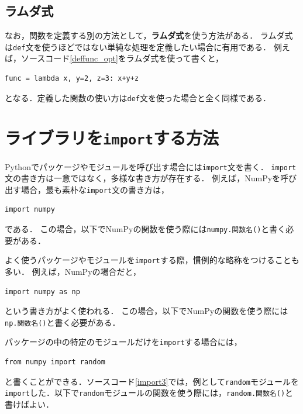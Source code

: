 \documentclass[a4paper,12pt]{jsarticle}
\begin{document}
\subsection{ラムダ式}

なお，関数を定義する別の方法として，{\bf ラムダ式}を使う方法がある．
ラムダ式は\texttt{def}文を使うほどではない単純な処理を定義したい場合に有用である．
例えば，ソースコード\ref{deffunc_opt}をラムダ式を使って書くと，
\begin{lstlisting}[caption=ラムダ式の使い方,label=lambda]
func = lambda x, y=2, z=3: x+y+z
\end{lstlisting}
となる．定義した関数の使い方は\texttt{def}文を使った場合と全く同様である．






\section{ライブラリを\texttt{import}する方法}

Pythonでパッケージやモジュールを呼び出す場合には\texttt{import}文を書く．
\texttt{import}文の書き方は一意ではなく，多様な書き方が存在する．
例えば，NumPyを呼び出す場合，最も素朴な\texttt{import}文の書き方は，
\begin{lstlisting}[caption=NumPyを呼び出す方法,label=import1]
import numpy
\end{lstlisting}
である．
この場合，以下でNumPyの関数を使う際には\texttt{numpy.関数名()}と書く必要がある．

よく使うパッケージやモジュールを\texttt{import}する際，慣例的な略称をつけることも多い．
例えば，NumPyの場合だと，
\begin{lstlisting}[caption=NumPyを呼び出す方法,label=import2]
import numpy as np
\end{lstlisting}
という書き方がよく使われる．
この場合，以下でNumPyの関数を使う際には\texttt{np.関数名()}と書く必要がある．

パッケージの中の特定のモジュールだけを\texttt{import}する場合には，
\begin{lstlisting}[caption=NumPyを呼び出す方法,label=import3]
from numpy import random
\end{lstlisting}
と書くことができる．ソースコード\ref{import3}では，例として\texttt{random}モジュールを\texttt{import}した．以下で\texttt{random}モジュールの関数を使う際には，\texttt{random.関数名()}と書けばよい．



\end{document}
